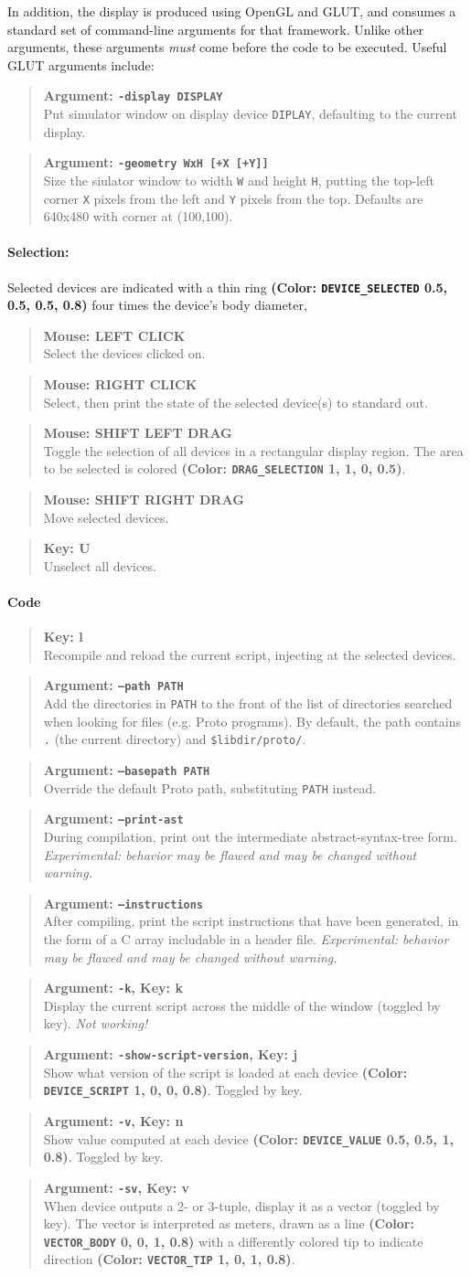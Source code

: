 \documentclass{article}
\newcommand\broken{{\em Not working!}}
\newcommand\experimental{{\em Experimental: behavior may be flawed and 
    may be changed without warning.}}
\newcommand\var[1]{{\tt #1}}
\newcommand\key[1]{{\bf #1}}
\newcommand\simarg[2]{\begin{quote} {\bf Argument: \var{#1}} \\ #2 \end{quote}}
\newcommand\simkey[2]{\begin{quote} {\bf Key: \key{#1}} \\ #2 \end{quote}}
\newcommand\simmouse[2]{\begin{quote} {\bf Mouse: \key{#1}} \\ #2 \end{quote}}
\newcommand\simargkey[3]{
  \begin{quote} {\bf Argument: \var{#1}, Key: \key{#2}} \\ #3 \end{quote}
}
\newcommand\color[5]{{\bf (Color: {\tt #1} #2, #3, #4, #5)}} %
\begin{document}
In addition, the display is produced using OpenGL and GLUT, and
consumes a standard set of command-line arguments for that framework.
Unlike other arguments, these arguments {\em must} come before the
code to be executed.  Useful GLUT arguments include:
\simarg{-display DISPLAY}{Put simulator window on display device
  \var{DIPLAY}, defaulting to the current display.}
\simarg{-geometry WxH [+X [+Y]]}{Size the siulator window to width
  \var{W} and height \var{H}, putting the top-left corner \var{X}
  pixels from the left and \var{Y} pixels from the top.  Defaults are
  640x480 with corner at (100,100).}

  
\paragraph{Selection:}
Selected devices are indicated with a thin ring
\color{DEVICE\_SELECTED}{0.5}{0.5}{0.5}{0.8} four times the device's
body diameter,

\simmouse{LEFT CLICK}{Select the devices clicked on.}
\simmouse{RIGHT CLICK}{Select, then print the state of the selected
  device(s) to standard out.}
\simmouse{SHIFT LEFT DRAG}{Toggle the selection of all devices in a
  rectangular display region.  The area to be selected is colored
  \color{DRAG\_SELECTION}{1}{1}{0}{0.5}.}
\simmouse{SHIFT RIGHT DRAG}{Move selected devices.}
\simkey{U}{Unselect all devices.}

\paragraph{Code}
\simkey{l}{Recompile and reload the current script, injecting at
  the selected devices.}
\simarg{--path PATH}{Add the directories in \var{PATH} to the front of the list
  of directories searched when looking for files (e.g. Proto programs).  By
  default, the path contains \var{.} (the current directory) and
  \var{\$libdir/proto/}.}
\simarg{--basepath PATH}{Override the default Proto path, substituting
  \var{PATH} instead.}
\simarg{--print-ast}{During compilation, print out the intermediate
  abstract-syntax-tree form. \experimental{}}
\simarg{--instructions}{After compiling, print the script instructions
  that have been generated, in the form of a C array includable in a 
  header file. \experimental{}}
\simargkey{-k}{k}{Display the current script across the middle of the window
  (toggled by key). \broken{}}
\simargkey{-show-script-version}{j}{Show what version of the script is
  loaded at each device \color{DEVICE\_SCRIPT}{1}{0}{0}{0.8}.  Toggled
  by key.}
\simargkey{-v}{n}{Show value computed at each device 
  \color{DEVICE\_VALUE}{0.5}{0.5}{1}{0.8}.  Toggled by key.}
\simargkey{-sv}{v}{When device outputs a 2- or 3-tuple, display it as
  a vector (toggled by key).  The vector is interpreted as meters,
  drawn as a line \color{VECTOR\_BODY}{0}{0}{1}{0.8} with a
  differently colored tip to indicate direction
  \color{VECTOR\_TIP}{1}{0}{1}{0.8}.}
  
\end{document}
